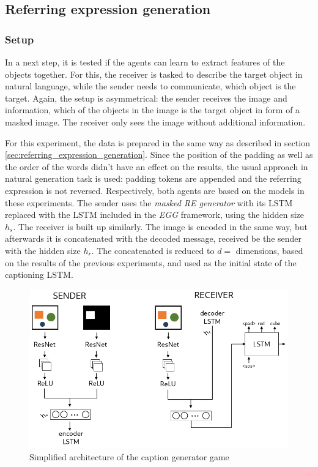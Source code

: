 \subsection{Referring expression generation}
\label{sec:referring-expression-generation-game}
\subsubsection*{Setup}

In a next step, it is tested if the agents can learn to extract features of the objects together.
For this, the receiver is tasked to describe the target object in natural language, while the sender needs to communicate, which object is the target.
Again, the setup is asymmetrical: the sender receives the image and information, which of the objects in the image is the target object in form of a masked image.
The receiver only sees the image without additional information.

For this experiment, the data is prepared in the same way as described in section \ref{sec:referring_expression_generation}.
Since the position of the padding as well as the order of the words didn't have an effect on the results, the usual approach in natural generation task is used: padding tokens are appended and the referring expression is not reversed.
Respectively, both agents are based on the models in these experiments.
The sender uses the \emph{masked RE generator} with its LSTM replaced with the LSTM included in the \emph{EGG} framework, using the hidden size $h_s$.
The receiver is built up similarly.
The image is encoded in the same way, but afterwards it is concatenated with the decoded message, received be the sender with the hidden size $h_r$.
The concatenated is reduced to $d=$ dimensions, based on the results of the previous experiments, and used as the initial state of the captioning LSTM.

\begin{figure}[ht]
    \centering
    \includegraphics[width=.7\linewidth]{figures/arch_caption_generator_game.png}
    \caption{Simplified architecture of the caption generator game}
    \label{fig:caption_generator_game_architecture}
\end{figure}

